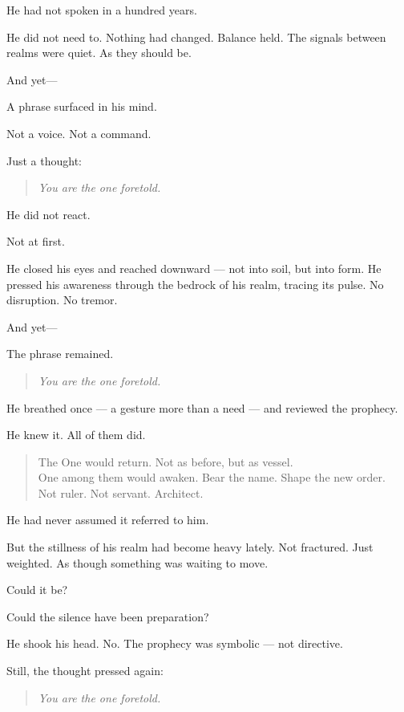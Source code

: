 \documentclass[12pt]{article}
\begin{document}
He had not spoken in a hundred years.

He did not need to. Nothing had changed. Balance held. The signals between realms were quiet. As they should be.

And yet—

A phrase surfaced in his mind.

Not a voice. Not a command.

Just a thought:

\begin{quote}
\emph{You are the one foretold.}
\end{quote}

He did not react.

Not at first.

He closed his eyes and reached downward — not into soil, but into form. He pressed his awareness through the bedrock of his realm, tracing its pulse. No disruption. No tremor.

And yet—

The phrase remained.

\begin{quote}
\emph{You are the one foretold.}
\end{quote}

He breathed once — a gesture more than a need — and reviewed the prophecy.

He knew it. All of them did.

\begin{quote}
The One would return. Not as before, but as vessel.\\
One among them would awaken. Bear the name. Shape the new order.\\
Not ruler. Not servant. Architect.
\end{quote}

He had never assumed it referred to him.

But the stillness of his realm had become heavy lately. Not fractured. Just weighted. As though something was waiting to move.

Could it be?

Could the silence have been preparation?

He shook his head. No. The prophecy was symbolic — not directive.

Still, the thought pressed again:

\begin{quote}
\emph{You are the one foretold.}
\end{quote}
\end{document}

